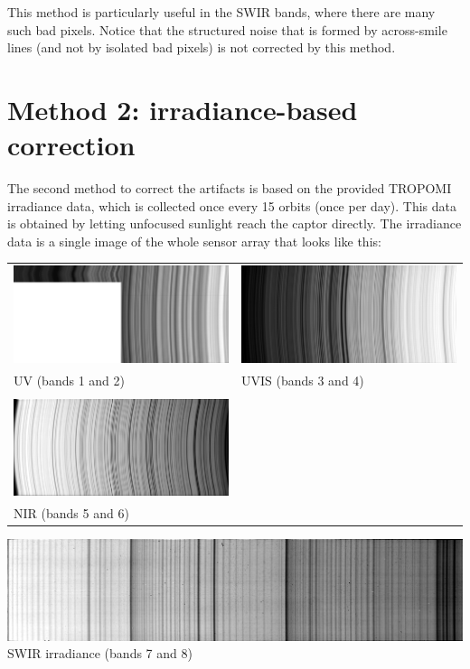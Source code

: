 \documentclass[a4paper]{article}    %
\theoremstyle{note}
\theoremstyle{plain}
\begin{document}
This method is particularly useful in the SWIR bands, where there are many
such bad pixels.  Notice that the structured noise that is formed by
across-smile lines (and not by isolated bad pixels) is not corrected by this
method.

\clearpage
\section{Method 2: irradiance-based correction}

The second method to correct the artifacts is based on the provided TROPOMI
irradiance data, which is collected once every 15 orbits (once per day).
This data is obtained by letting unfocused sunlight reach the captor
directly.  The irradiance data is a single image of the whole sensor array
that looks like this:

\begin{tabular}{ll}
	\includegraphics[width=0.48\linewidth]{f/irradiance_12.png} &
	\includegraphics[width=0.48\linewidth]{f/irradiance_34.png} \\
	UV (bands 1 and 2)& UVIS (bands 3 and 4) \\
	& \\
	\includegraphics[width=0.48\linewidth]{f/irradiance_56.png} &
	\\
	NIR (bands 5 and 6) %
\end{tabular}


\includegraphics[width=\linewidth]{f/irradiance_78.png}\\
SWIR irradiance (bands 7 and 8)
\end{document}
